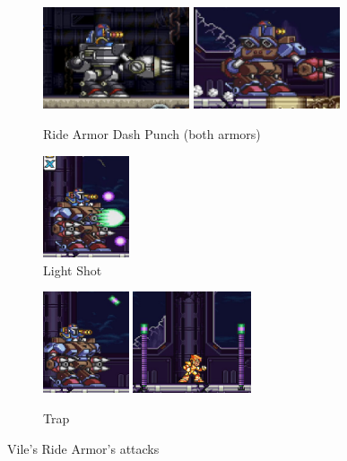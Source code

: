 \begin{figure}[htp]
	\centering
	\begin{subfigure}{\linewidth}
		\centering
		\includegraphics[height=3cm]{figures/X3/Doppler_stages/vile_armor_punch.jpg}
		\includegraphics[height=3cm]{figures/X3/Doppler_stages/vile_bb_punch.jpg}
		\caption{Ride Armor Dash Punch (both armors)}
	\end{subfigure}
	
	\begin{subfigure}{.22\linewidth}
		\centering
		\includegraphics[height=3cm]{figures/X3/Doppler_stages/vile_bb_shot.jpg}
		\caption{Light Shot}
	\end{subfigure}
	\begin{subfigure}{.6\linewidth}
		\centering
		\includegraphics[height=3cm]{figures/X3/Doppler_stages/vile_bb_trap_1.jpg}
		\includegraphics[height=3cm]{figures/X3/Doppler_stages/vile_bb_trap_2.jpg}
		\caption{Trap}
	\end{subfigure}
	\caption{Vile's Ride Armor's attacks}
\end{figure}

